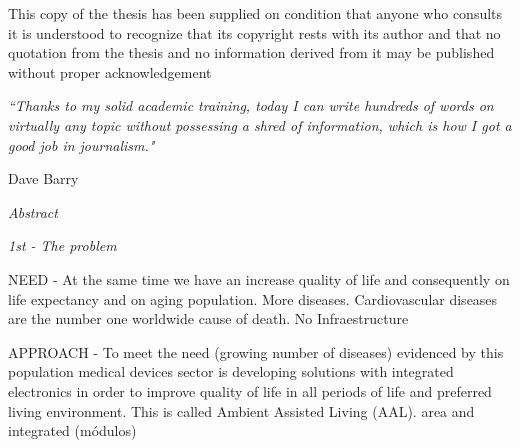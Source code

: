 \documentclass[11pt, oneside]{Thesis} %
\begin{document}
This copy of the thesis has been supplied on condition that anyone who
consults it is understood to recognize that its copyright rests with its author and that
no quotation from the thesis and no information derived from it may be published
without proper acknowledgement

\clearpage


\null\vfill %

\textit{``Thanks to my solid academic training, today I can write hundreds of words on virtually any topic without possessing a shred of information, which is how I got a good job in journalism."}

\begin{flushright}
Dave Barry
\end{flushright}

\vfill\vfill\vfill\vfill\vfill\vfill\null %

\clearpage %

\thispagestyle{plain}

\begin{center}
 {\huge{\textit{Abstract}} \par}
  \bigskip
\end{center}



\textit{\Large 1st - The problem}

NEED - At the same time we have an increase quality of life and consequently on life expectancy and on aging population. More diseases. Cardiovascular diseases are the number one worldwide cause of death. No Infraestructure

APPROACH - To meet the need (growing number of diseases) evidenced by this population medical devices sector is developing solutions with integrated electronics in order to improve quality of life in all periods of life and preferred living environment. This is called Ambient Assisted Living (AAL). area and integrated (módulos)
\end{document}
